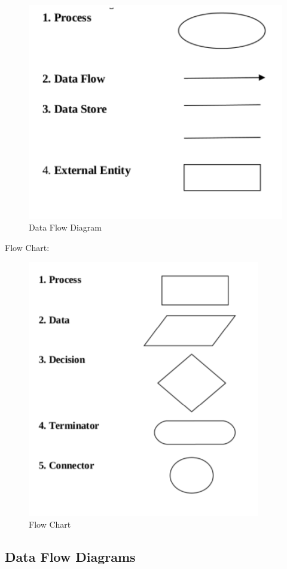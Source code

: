 \documentclass[12pt]{article}
\begin{document}
\begin{enumerate}
\begin{figure}[!h]
 \centering
\includegraphics[scale=0.50]{images/diag.png}
\caption{Data Flow Diagram}
\end{figure}
Flow Chart:\\[0.5cm]
\begin{figure}[!h]
\centering
\includegraphics[scale=0.50]{images/flowc.png}
\caption{Flow Chart}
\end{figure}

\newpage
\subsection{Data Flow Diagrams}

\end{enumerate}
\end{document}
